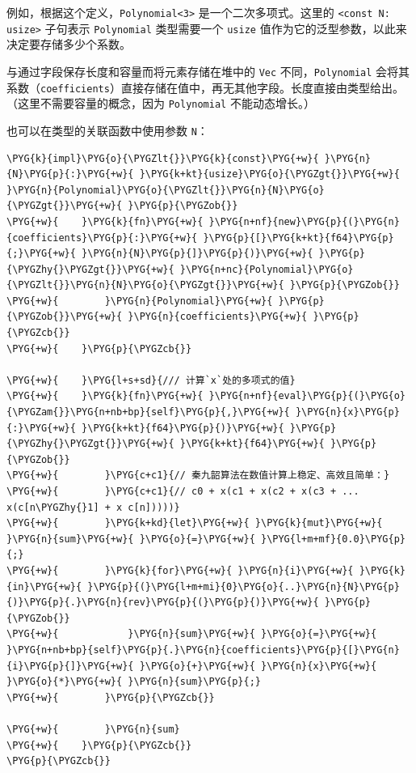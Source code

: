 例如，根据这个定义，\texttt{Polynomial<3>} 是一个二次多项式。这里的 \texttt{<const N: usize>} 子句表示 \texttt{Polynomial} 类型需要一个 \texttt{usize} 值作为它的泛型参数，以此来决定要存储多少个系数。

与通过字段保存长度和容量而将元素存储在堆中的 \texttt{Vec} 不同，\texttt{Polynomial} 会将其系数（\texttt{coefficients}）直接存储在值中，再无其他字段。长度直接由类型给出。（这里不需要容量的概念，因为 \texttt{Polynomial} 不能动态增长。）

也可以在类型的关联函数中使用参数 \texttt{N}：

\begin{Verbatim}[commandchars=\\\{\},breaklines=true,breakanywhere=true,fontsize=\codefont,xleftmargin=17bp]
\PYG{k}{impl}\PYG{o}{\PYGZlt{}}\PYG{k}{const}\PYG{+w}{ }\PYG{n}{N}\PYG{p}{:}\PYG{+w}{ }\PYG{k+kt}{usize}\PYG{o}{\PYGZgt{}}\PYG{+w}{ }\PYG{n}{Polynomial}\PYG{o}{\PYGZlt{}}\PYG{n}{N}\PYG{o}{\PYGZgt{}}\PYG{+w}{ }\PYG{p}{\PYGZob{}}
\PYG{+w}{    }\PYG{k}{fn}\PYG{+w}{ }\PYG{n+nf}{new}\PYG{p}{(}\PYG{n}{coefficients}\PYG{p}{:}\PYG{+w}{ }\PYG{p}{[}\PYG{k+kt}{f64}\PYG{p}{;}\PYG{+w}{ }\PYG{n}{N}\PYG{p}{]}\PYG{p}{)}\PYG{+w}{ }\PYG{p}{\PYGZhy{}\PYGZgt{}}\PYG{+w}{ }\PYG{n+nc}{Polynomial}\PYG{o}{\PYGZlt{}}\PYG{n}{N}\PYG{o}{\PYGZgt{}}\PYG{+w}{ }\PYG{p}{\PYGZob{}}
\PYG{+w}{        }\PYG{n}{Polynomial}\PYG{+w}{ }\PYG{p}{\PYGZob{}}\PYG{+w}{ }\PYG{n}{coefficients}\PYG{+w}{ }\PYG{p}{\PYGZcb{}}
\PYG{+w}{    }\PYG{p}{\PYGZcb{}}

\PYG{+w}{    }\PYG{l+s+sd}{/// 计算`x`处的多项式的值}
\PYG{+w}{    }\PYG{k}{fn}\PYG{+w}{ }\PYG{n+nf}{eval}\PYG{p}{(}\PYG{o}{\PYGZam{}}\PYG{n+nb+bp}{self}\PYG{p}{,}\PYG{+w}{ }\PYG{n}{x}\PYG{p}{:}\PYG{+w}{ }\PYG{k+kt}{f64}\PYG{p}{)}\PYG{+w}{ }\PYG{p}{\PYGZhy{}\PYGZgt{}}\PYG{+w}{ }\PYG{k+kt}{f64}\PYG{+w}{ }\PYG{p}{\PYGZob{}}
\PYG{+w}{        }\PYG{c+c1}{// 秦九韶算法在数值计算上稳定、高效且简单：}
\PYG{+w}{        }\PYG{c+c1}{// c0 + x(c1 + x(c2 + x(c3 + ... x(c[n\PYGZhy{}1] + x c[n]))))}
\PYG{+w}{        }\PYG{k+kd}{let}\PYG{+w}{ }\PYG{k}{mut}\PYG{+w}{ }\PYG{n}{sum}\PYG{+w}{ }\PYG{o}{=}\PYG{+w}{ }\PYG{l+m+mf}{0.0}\PYG{p}{;}
\PYG{+w}{        }\PYG{k}{for}\PYG{+w}{ }\PYG{n}{i}\PYG{+w}{ }\PYG{k}{in}\PYG{+w}{ }\PYG{p}{(}\PYG{l+m+mi}{0}\PYG{o}{..}\PYG{n}{N}\PYG{p}{)}\PYG{p}{.}\PYG{n}{rev}\PYG{p}{(}\PYG{p}{)}\PYG{+w}{ }\PYG{p}{\PYGZob{}}
\PYG{+w}{            }\PYG{n}{sum}\PYG{+w}{ }\PYG{o}{=}\PYG{+w}{ }\PYG{n+nb+bp}{self}\PYG{p}{.}\PYG{n}{coefficients}\PYG{p}{[}\PYG{n}{i}\PYG{p}{]}\PYG{+w}{ }\PYG{o}{+}\PYG{+w}{ }\PYG{n}{x}\PYG{+w}{ }\PYG{o}{*}\PYG{+w}{ }\PYG{n}{sum}\PYG{p}{;}
\PYG{+w}{        }\PYG{p}{\PYGZcb{}}

\PYG{+w}{        }\PYG{n}{sum}
\PYG{+w}{    }\PYG{p}{\PYGZcb{}}
\PYG{p}{\PYGZcb{}}
\end{Verbatim}

